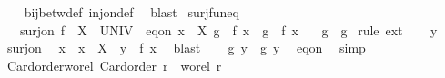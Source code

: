 \begin{isabellebody}
%
\isadelimproof
\ \ %
\endisadelimproof
%
\isatagproof
{}\isamarkupfalse%
\ bij{\isacharunderscore}{\kern0pt}betw{\isacharunderscore}{\kern0pt}def\ inj{\isacharunderscore}{\kern0pt}on{\isacharunderscore}{\kern0pt}def\ \isamarkupfalse%
\ blast%
\endisatagproof
{\isafoldproof}%
%
\isadelimproof
\isanewline
%
\endisadelimproof
\isanewline
{}\isamarkupfalse%
\ surj{\isacharunderscore}{\kern0pt}fun{\isacharunderscore}{\kern0pt}eq{\isacharcolon}{\kern0pt}\isanewline
\ \ \ surj{\isacharunderscore}{\kern0pt}on{\isacharcolon}{\kern0pt}\ {\isachardoublequoteopen}f\ {\isacharbackquote}{\kern0pt}\ X\ {\isacharequal}{\kern0pt}\ UNIV{\isachardoublequoteclose}\ \ eq{\isacharunderscore}{\kern0pt}on{\isacharcolon}{\kern0pt}\ {\isachardoublequoteopen}{\isasymforall}x\ {\isasymin}\ X{\isachardot}{\kern0pt}\ {\isacharparenleft}{\kern0pt}g{}\ {\isasymcirc}\ f{\isacharparenright}{\kern0pt}\ x\ {\isacharequal}{\kern0pt}\ {\isacharparenleft}{\kern0pt}g{}\ {\isasymcirc}\ f{\isacharparenright}{\kern0pt}\ x{\isachardoublequoteclose}\isanewline
\ \ \ {\isachardoublequoteopen}g{}\ {\isacharequal}{\kern0pt}\ g{}{\isachardoublequoteclose}\isanewline
%
\isadelimproof
%
\endisadelimproof
%
\isatagproof
{}\isamarkupfalse%
\ {\isacharparenleft}{\kern0pt}rule\ ext{\isacharparenright}{\kern0pt}\isanewline
\ \ \isamarkupfalse%
\ y\isanewline
\ \ \isamarkupfalse%
\ surj{\isacharunderscore}{\kern0pt}on\ \isamarkupfalse%
\ x\ \ {\isachardoublequoteopen}x\ {\isasymin}\ X{\isachardoublequoteclose}\ \ {\isachardoublequoteopen}y\ {\isacharequal}{\kern0pt}\ f\ x{\isachardoublequoteclose}\ \isamarkupfalse%
\ blast\isanewline
\ \ \isamarkupfalse%
\ {\isachardoublequoteopen}g{}\ y\ {\isacharequal}{\kern0pt}\ g{}\ y{\isachardoublequoteclose}\ \isamarkupfalse%
\ eq{\isacharunderscore}{\kern0pt}on\ \isamarkupfalse%
\ simp\isanewline
{}\isamarkupfalse%
%
\endisatagproof
{\isafoldproof}%
%
\isadelimproof
\isanewline
%
\endisadelimproof
\isanewline
{}\isamarkupfalse%
\ Card{\isacharunderscore}{\kern0pt}order{\isacharunderscore}{\kern0pt}wo{\isacharunderscore}{\kern0pt}rel{\isacharcolon}{\kern0pt}\ {\isachardoublequoteopen}Card{\isacharunderscore}{\kern0pt}order\ r\ {\isasymLongrightarrow}\ wo{\isacharunderscore}{\kern0pt}rel\ r{\isachardoublequoteclose}\isanewline

\end{isabellebody}
